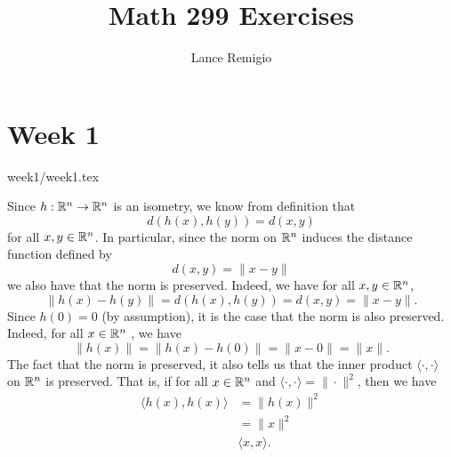 \documentclass[a4paper]{article}
\title{Math 299 Exercises}
\author{Lance Remigio}
\begin{document}
\maketitle    
\tableofcontents

\section{Week 1}

{week1/week1.tex}

Since \( h: \mathbb{R}^{n} \to \mathbb{R}^{n}  \) is an isometry, we know from definition that 
\[  d(h(x), h(y)) = d(x,y) \]
for all \( x,y \in \mathbb{R}^{n} \). In particular, since the norm on \( \mathbb{R}^{n} \) induces the distance function defined by
\[  d(x,y) = \|x - y\| \]
we also have that the norm is preserved. Indeed, we have for all \( x,y \in \mathbb{R}^{n} \),
\[  \|h(x) - h(y)\| = d(h(x), h(y)) = d(x,y) = \|x-y\|. \]
Since \( h(0) = 0  \) (by assumption), it is the case that the norm is also preserved. Indeed, for all \( x\in \mathbb{R}^{n} \)
, we have 
\[  \|h(x)\| = \|h(x) - h(0)\| = \|x - 0\|  = \|x\|.\]
The fact that the norm is preserved, it also tells us that the inner product \( \langle \cdot , \cdot \rangle \) on \( \mathbb{R}^{n} \) is preserved. That is, if for all \( x \in \mathbb{R}^{n} \) and \( \langle \cdot , \cdot \rangle = \|\cdot\|^{2}  \), then we have 
\begin{align*}
    \langle h(x), h(x) \rangle &= \|h(x) \|^{2} \\
                                              &= \|x\|^{2} \\
                                              & \langle x  ,x \rangle.
\end{align*}
 
\end{document}
